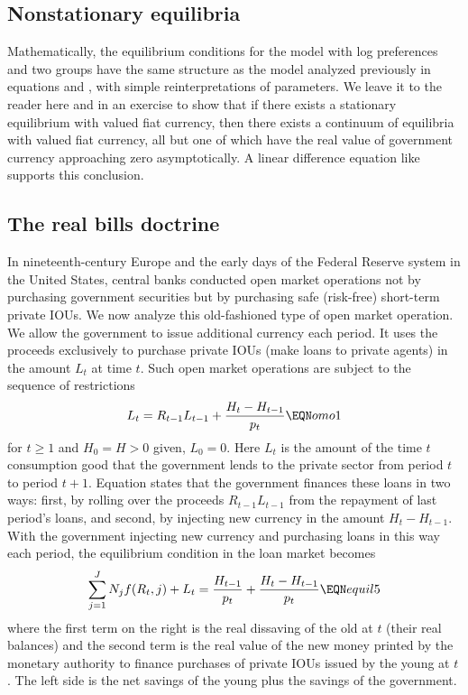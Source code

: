 \subsection{Nonstationary equilibria}

Mathematically, the equilibrium conditions for the
 model with log preferences and
two groups have the same structure as the model analyzed
previously in equations  and ,
 with simple reinterpretations of
parameters.  We leave it to the reader here and in an exercise
to show that if there exists a stationary equilibrium with
valued fiat currency, then there exists a continuum of
equilibria with valued fiat currency, all but one of which
have the real value of government currency approaching
zero asymptotically.  A linear difference equation
like  supports this conclusion.

\subsection{The real bills doctrine}

In nineteenth-century Europe and the early days of the Federal Reserve system
in the United States, central banks conducted open market operations not by
purchasing government securities but by purchasing safe (risk-free)
short-term private IOUs.
 We now analyze this old-fashioned type of
open market operation. We allow the government to issue additional
currency each period.  It uses the proceeds exclusively to purchase
private IOUs (make loans to private agents) in the amount $L_t$ at time $t$.
 Such open market
operations are subject to the sequence of restrictions
$$L_t = R_{t-1} L_{t-1} + {H_t - H_{t-1} \over p_t} \EQN omo1  $$
for $t \geq 1$ and $H_0 = H>0$ given, $L_0 = 0$.
Here $L_t$ is the amount of the time $t$ consumption good that the government
lends to the private sector from period $t$ to period $t+1$.
Equation  states that the government finances these loans in two ways: first,
by rolling over the  proceeds
$R_{t-1} L_{t-1}$ from the repayment of last period's loans, and second, by injecting new  currency  in the
amount $H_t-H_{t-1}$.  With the government injecting new currency and purchasing loans in this
way each period, the equilibrium condition in the loan market becomes
$$ \sum_{j=1}^J N_j f(R_t, j) + L_t = {H_{t-1}\over p_t}
    + {H_{t}- H_{t-1} \over p_t}   \EQN equil5
$$
where the first term on the right is the real dissaving of the
old at $t$ (their real balances) and the second term
is the real value of the new money printed by the monetary
authority to finance purchases of private IOUs issued
by the young at $t$.  The left side is the net savings of
the young plus the savings of the government.

